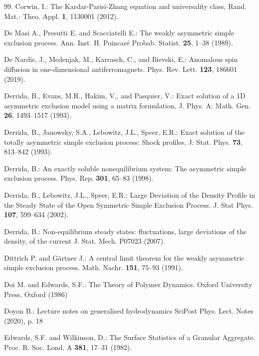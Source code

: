 \documentclass[12pt]{article}
\begin{document}
\begin{thebibliography}{99.}
Corwin, I.:
The Kardar-Parisi-Zhang equation and universality class,
Rand. Mat.: Theo. Appl. \textbf{1}, 1130001 (2012).

De Masi A., Presutti E. and Scacciatelli E.: 
The weakly asymmetric simple exclusion process. 
Ann. Inst. H. Poincar\'e Probab. Statist. \textbf{25}, 1--38 (1989).

De Nardis, J., Medenjak, M., Karrasch, C., and Ilievski, E.:
Anomalous spin diffusion in one-dimensional antiferromagnets.
Phys. Rev. Lett. \textbf{123}, 186601 (2019).

Derrida, B., Evans, M.R., Hakim, V., and Pasquier, V.:
Exact solution of a 1D asymmetric exclusion model using a matrix formulation,
J. Phys. A: Math. Gen. \textbf{26}, 1493--1517 (1993).

Derrida, B., Janowsky, S.A., Lebowitz, J.L., Speer, E.R.: 
Exact solution of the totally asymmetric simple exclusion process: Shock profiles, 
J. Stat. Phys. \textbf{73}, 813--842 (1993).

Derrida, B.: 
An exactly soluble nonequilibrium system: The asymmetric simple exclusion process.
Phys. Rep. \textbf{301}, 65--83 (1998).

Derrida, B., Lebowitz, J.L., Speer, E.R.: 
Large Deviation of the Density Profile in the Steady State of the Open Symmetric Simple Exclusion Process.
J. Stat Phys. \textbf{107}, 599--634 (2002).

Derrida, B.: 
Non-equilibrium steady states: fluctuations, large deviations of the density, of the current  
J. Stat. Mech. P07023 (2007).

Dittrich P. and G\"artner J.: 
A central limit theorem for the weakly asymmetric simple exclusion process. 
Math. Nachr. \textbf{151}, 75--93 (1991).

Doi M. and Edwards, S.F.:
The Theory of Polymer Dynamics.
Oxford University Press, Oxford (1986)

Doyon B.:
Lecture notes on generalised hydrodynamics
SciPost Phys. Lect. Notes (2020), p. 18

Edwards, S.F. and Wilkinson, D.:
The Surface Statistics of a Granular Aggregate.
Proc. R. Soc. Lond. A \textbf{381}, 17--31 (1982).


\end{thebibliography}
\end{document}
